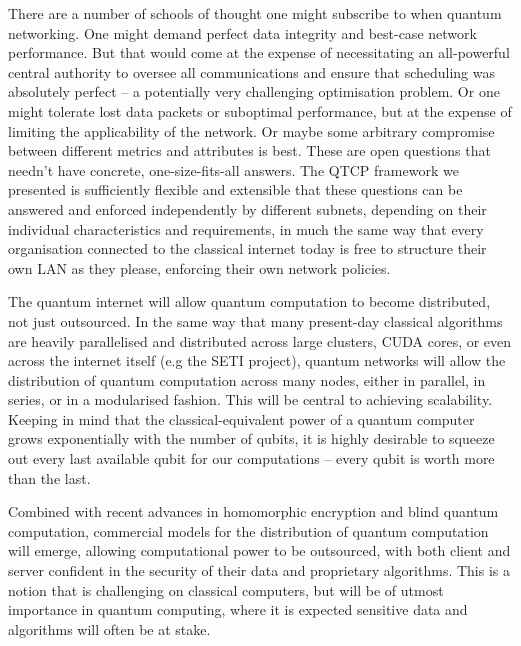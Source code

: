 \documentclass[aps,rmp,twocolumn,amsmath,amssymb,nofootinbib,superscriptaddress]{revtex4}
\begin{document}
There are a number of schools of thought one might subscribe to when quantum networking. One might demand perfect data integrity and best-case network performance. But that would come at the expense of necessitating an all-powerful central authority to oversee all communications and ensure that scheduling was absolutely perfect -- a potentially very challenging optimisation problem. Or one might tolerate lost data packets or suboptimal performance, but at the expense of limiting the applicability of the network. Or maybe some arbitrary compromise between different metrics and attributes is best. These are open questions that needn't have concrete, one-size-fits-all answers. The QTCP framework we presented is sufficiently flexible and extensible that these questions can be answered and enforced independently by different subnets, depending on their individual characteristics and requirements, in much the same way that every organisation connected to the classical internet today is free to structure their own LAN as they please, enforcing their own network policies.

The quantum internet will allow quantum computation to become distributed, not just outsourced. In the same way that many present-day classical algorithms are heavily parallelised and distributed across large clusters, CUDA cores, or even across the internet itself (e.g the SETI project), quantum networks will allow the distribution of quantum computation across many nodes, either in parallel, in series, or in a modularised fashion. This will be central to achieving scalability. Keeping in mind that the classical-equivalent power of a quantum computer grows exponentially with the number of qubits, it is highly desirable to squeeze out every last available qubit for our computations -- every qubit is worth more than the last.

Combined with recent advances in homomorphic encryption and blind quantum computation, commercial models for the distribution of quantum computation will emerge, allowing computational power to be outsourced, with both client and server confident in the security of their data and proprietary algorithms. This is a notion that is challenging on classical computers, but will be of utmost importance in quantum computing, where it is expected sensitive data and algorithms will often be at stake.
\end{document}
